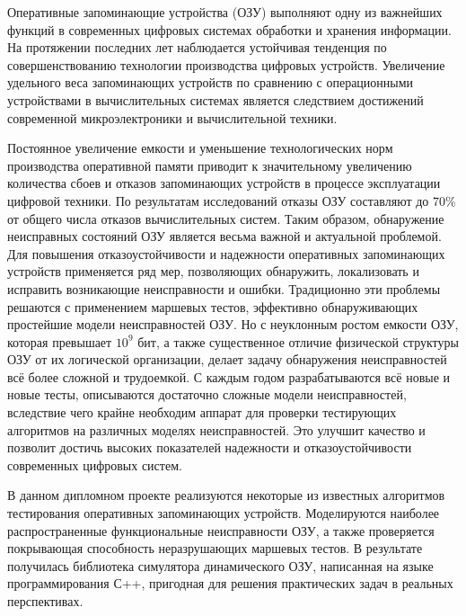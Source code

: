 \label{sec:intro}

Оперативные запоминающие устройства (ОЗУ) выполняют одну из важнейших функций в современных цифровых системах обработки и хранения информации. На протяжении последних лет наблюдается устойчивая тенденция по совершенствованию технологии производства цифровых устройств. Увеличение удельного веса запоминающих устройств по сравнению с операционными устройствами в вычислительных системах является следствием достижений современной микроэлектроники и вычислительной техники. 

Постоянное увеличение емкости и уменьшение технологических норм производства оперативной памяти приводит к значительному увеличению количества сбоев и отказов запоминающих устройств в процессе эксплуатации цифровой техники. По результатам исследований отказы ОЗУ составляют до 70\% от общего числа отказов вычислительных систем. Таким образом, обнаружение неисправных состояний ОЗУ является весьма важной и актуальной проблемой. Для повышения отказоустойчивости и надежности оперативных запоминающих устройств применяется ряд мер, позволяющих обнаружить, локализовать и исправить возникающие неисправности и ошибки. Традиционно эти проблемы решаются с применением маршевых тестов, эффективно обнаруживающих простейшие модели неисправностей ОЗУ. Но с неуклонным ростом емкости ОЗУ, которая превышает $10^9$ бит, а также существенное отличие физической структуры ОЗУ от их логической организации, делает задачу обнаружения неисправностей всё более сложной и трудоемкой. С каждым годом разрабатываются всё новые и новые тесты, описываются достаточно сложные модели неисправностей, вследствие чего крайне необходим аппарат для проверки тестирующих алгоритмов на различных  моделях неисправностей. Это улучшит качество и позволит достичь высоких показателей надежности и отказоустойчивости современных цифровых систем.

В данном дипломном проекте реализуются некоторые из известных алгоритмов тестирования оперативных запоминающих устройств. Моделируются наиболее распространенные функциональные неисправности ОЗУ, а также проверяется покрывающая способность неразрушающих маршевых тестов.
В результате получилась библиотека симулятора динамического ОЗУ, написанная на языке программирования С++, пригодная для решения практических задач в реальных перспективах.
